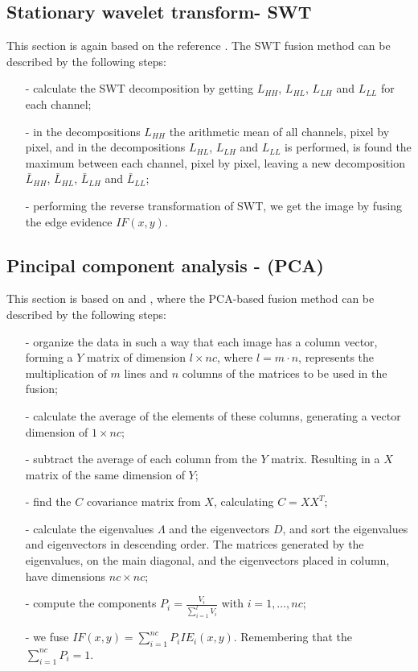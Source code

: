 \documentclass[conference]{IEEEtran}
\begin{document}
\subsection{Stationary wavelet transform- SWT} 
This section is again based on the reference \cite{n_r}. The SWT fusion method can be described by the following steps:
\begin{itemize}
\item[-] calculate the SWT decomposition by getting $L_{HH}$, $L_{HL}$, $L_{LH}$ and $L_{LL}$ for each channel;
\item[-] in the decompositions $L_{HH}$ the arithmetic mean of all channels, pixel by pixel, and in the decompositions $L_{HL}$, $L_{LH}$ and $L_{LL}$ is performed, is found the maximum between each channel, pixel by pixel, leaving a new decomposition $\bar{L}_{HH}$, $\bar{L}_{HL}$, $\bar{L}_{LH}$ and $\bar{L}_{LL}$;
\item[-] performing the reverse transformation of SWT, we get the image by fusing the edge evidence $IF(x,y)$.  
\end{itemize}

\subsection{Pincipal component analysis - (PCA) }
This section is based on \cite{n_r} and \cite{mit}, where the PCA-based fusion method can be described by the following steps:
\begin{itemize}
\item[-] organize the data in such a way that each image has a column vector, forming a $Y$ matrix of dimension $l\times nc$, where $l=m\cdot n$, represents the multiplication of $m$ lines and $n$ columns of the matrices to be used in the fusion;
\item[-] calculate the average of the elements of these columns, generating a vector dimension of $1\times nc$;
\item[-] subtract the average of each column from the $Y$ matrix. Resulting in a $X$ matrix of the same dimension of $Y$; 
\item[-] find the $C$ covariance matrix from $X$, calculating $C=XX^T$;
\item[-] calculate the eigenvalues $\Lambda$ and the eigenvectors $D$, and sort the eigenvalues and eigenvectors in descending order. The matrices generated by the eigenvalues, on the main diagonal, and the eigenvectors placed in column, have dimensions $nc\times nc$;
\item[-] compute the components $P_i=\frac{V_i}{\sum_{i=1}^l V_i}$ with $i=1,\dots,nc$;
\item[-] we fuse $IF(x,y)=\sum_{i=1}^{nc}P_iIE_i(x,y)$. Remembering that the $\sum_{i=1}^{nc}P_i=1$.
\end{itemize}
\end{document}
